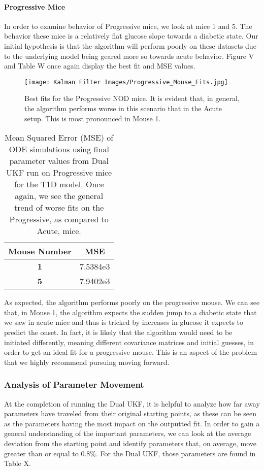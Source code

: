 \paragraph{Progressive Mice}
In order to examine behavior of Progressive mice, we look at mice 1 and 5. The behavior these mice is a relatively flat glucose slope towards a diabetic state. Our initial hypothesis is that the algorithm will perform poorly on these datasets due to the underlying model being geared more so towards acute behavior. Figure V and Table W once again display the best fit and MSE values.

\begin{figure}[H]
    \centering
    \texttt{[image: Kalman Filter Images/Progressive\_Mouse\_Fits.jpg]}
    \caption{Best fits for the Progressive NOD mice. It is evident that, in general, the algorithm performs worse in this scenario that in the Acute setup. This is most pronounced in Mouse 1.}
\end{figure}

\begin{table}[H]
  \begin{center}
    \label{tab:table1}
    \begin{tabular}{c|c} %
      \textbf{Mouse Number} & \textbf{MSE} \\
      \hline
      \textbf{1} & 7.5384e3\\
      \textbf{5} & 7.9402e3
    \end{tabular}
    \caption{Mean Squared Error (MSE) of ODE simulations using final parameter values from Dual UKF run on Progressive mice for the T1D model. Once again, we see the general trend of worse fits on the Progressive, as compared to Acute, mice.}
  \end{center}
\end{table}


As expected, the algorithm performs poorly on the progressive mouse. We can see that, in Mouse 1, the algorithm expects the sudden jump to a diabetic state that we saw in acute mice and thus is tricked by increases in glucose it expects to predict the onset. In fact, it is likely that the algorithm would need to be initiated differently, meaning different covariance matrices and initial guesses, in order to get an ideal fit for a progressive mouse. This is an aspect of the problem that we highly recommend pursuing moving forward.

\subsubsection{Analysis of Parameter Movement}
At the completion of running the Dual UKF, it is helpful to analyze how far away parameters have traveled from their original starting points, as these can be seen as the parameters having the most impact on the outputted fit. In order to gain a general understanding of the important parameters, we can look at the average deviation from the starting point and identify parameters that, on average, move greater than or equal to 0.8\%. For the Dual UKF, those parameters are found in Table X.

